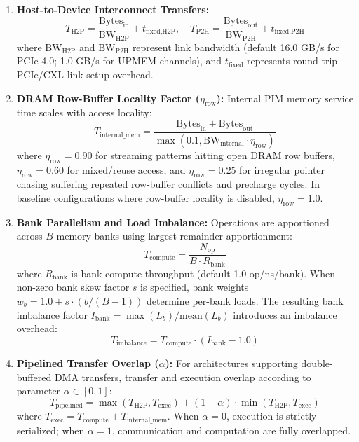 \documentclass[journal,10pt,twocolumn]{IEEEtran}
\begin{document}
\begin{enumerate}
    \item \textbf{Host-to-Device Interconnect Transfers:}
    \begin{equation}
    T_{\text{H2P}} = \frac{\text{Bytes}_{\text{in}}}{\text{BW}_{\text{H2P}}} + t_{\text{fixed,H2P}}, \quad T_{\text{P2H}} = \frac{\text{Bytes}_{\text{out}}}{\text{BW}_{\text{P2H}}} + t_{\text{fixed,P2H}}
    \end{equation}
    where $\text{BW}_{\text{H2P}}$ and $\text{BW}_{\text{P2H}}$ represent link bandwidth (default 16.0 GB/s for PCIe 4.0; 1.0 GB/s for UPMEM channels), and $t_{\text{fixed}}$ represents round-trip PCIe/CXL link setup overhead.
    \item \textbf{DRAM Row-Buffer Locality Factor ($\eta_{\text{row}}$):} Internal PIM memory service time scales with access locality:
    \begin{equation}
    T_{\text{internal\_mem}} = \frac{\text{Bytes}_{\text{in}} + \text{Bytes}_{\text{out}}}{\max(0.1, \text{BW}_{\text{internal}} \cdot \eta_{\text{row}})}
    \end{equation}
    where $\eta_{\text{row}} = 0.90$ for streaming patterns hitting open DRAM row buffers, $\eta_{\text{row}} = 0.60$ for mixed/reuse access, and $\eta_{\text{row}} = 0.25$ for irregular pointer chasing suffering repeated row-buffer conflicts and precharge cycles. In baseline configurations where row-buffer locality is disabled, $\eta_{\text{row}} = 1.0$.
    \item \textbf{Bank Parallelism and Load Imbalance:} Operations are apportioned across $B$ memory banks using largest-remainder apportionment:
    \begin{equation}
    T_{\text{compute}} = \frac{N_{\text{op}}}{B \cdot R_{\text{bank}}}
    \end{equation}
    where $R_{\text{bank}}$ is bank compute throughput (default 1.0 op/ns/bank). When non-zero bank skew factor $s$ is specified, bank weights $w_b = 1.0 + s \cdot (b / (B-1))$ determine per-bank loads. The resulting bank imbalance factor $I_{\text{bank}} = \max(L_b) / \text{mean}(L_b)$ introduces an imbalance overhead:
    \begin{equation}
    T_{\text{imbalance}} = T_{\text{compute}} \cdot (I_{\text{bank}} - 1.0)
    \end{equation}
    \item \textbf{Pipelined Transfer Overlap ($\alpha$):} For architectures supporting double-buffered DMA transfers, transfer and execution overlap according to parameter $\alpha \in [0, 1]$:
    \begin{equation}
    T_{\text{pipelined}} = \max\left(T_{\text{H2P}}, T_{\text{exec}}\right) + (1 - \alpha) \cdot \min\left(T_{\text{H2P}}, T_{\text{exec}}\right)
    \end{equation}
    where $T_{\text{exec}} = T_{\text{compute}} + T_{\text{internal\_mem}}$. When $\alpha = 0$, execution is strictly serialized; when $\alpha = 1$, communication and computation are fully overlapped.
\end{enumerate}
\end{document}
